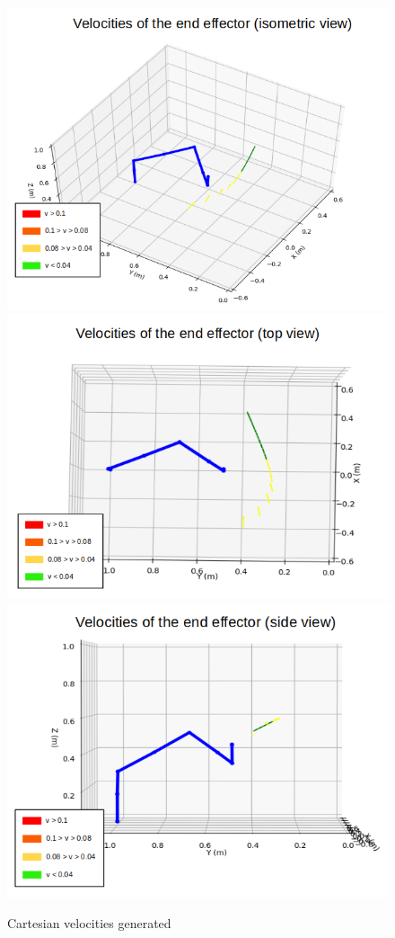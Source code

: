 \documentclass[a4paper, 10pt, conference]{ieeeconf}      %
\begin{document}
\begin{figure}[H]
	\centering
	\includegraphics[scale=0.25]{images/two_arms_vector.png}
	\includegraphics[scale=0.25]{images/two_arms_vector_top.png}
	\includegraphics[scale=0.25]{images/two_arms_vector_side.png}
	\caption{Cartesian velocities generated}
	\label{fig:two_arm_avoidance_vector}
\end{figure}
\end{document}
